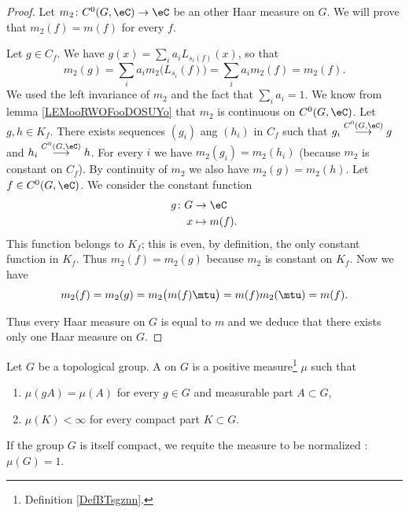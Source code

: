 \begin{proof}
    Let \( m_2\colon C^0(G,\eC)\to \eC\) be an other Haar measure on \( G\). We will prove that \( m_2(f)=m(f)\) for every \( f\). 
    \begin{subproof}
    \spitem[\( m_2\) is constant on \( C_f\)]
        Let \( g\in C_f\). We have \( g(x)=\sum_ia_iL_{s_i(f)}(x)\), so that
        \begin{equation}
            m_2(g)=\sum_ia_im_2\big(L_{s_i}(f)\big)=\sum_ia_im_2(f)=m_2(f).
        \end{equation}
        We used the left invariance of \( m_2\) and the fact that \( \sum_ia_i=1\).
    \spitem[\( m_2\) is constant on \( K_f\)]
        We know from lemma \ref{LEMooRWOFooDOSUYo} that \( m_2\) is continuous on \( C^0(G,\eC)\). Let \( g,h\in K_f\). There exists sequences \( (g_i)\) ang \( (h_i)\) in \( C_f\) such that \( g_i\stackrel{C^0(G,\eC)}{\longrightarrow}g\) and \( h_i\stackrel{C^0(G,\eC)}{\longrightarrow} h\). For every \( i\) we have \( m_2(g_i)=m_2(h_i)\) (because \( m_2\) is constant on \( C_f\)). By continuity of \( m_2\) we also have \( m_2(g)=m_2(h)\).
    \spitem[\( m_2=m\)]
        Let \( f\in C^0(G,\eC)\). We consider the constant function 
        \begin{equation}
            \begin{aligned}
                g\colon G&\to \eC \\
                x&\mapsto m(f). 
            \end{aligned}
        \end{equation}
        This function belongs to \( K_f\); this is even, by definition, the only constant function in \( K_f\). Thus \( m_2(f)=m_2(g)\) because \( m_2\) is constant on \( K_f\). Now we have
        \begin{equation}
            m_2(f)=m_2(g)=m_2\big( m(f)\mtu \big)=m(f)m_2(\mtu)=m(f).
        \end{equation}
    \end{subproof}
    Thus every Haar measure on \( G\) is equal to \( m\) and we deduce that there exists only one Haar measure on \( G\).
\end{proof}

\begin{definition}      \label{DEFooXIKEooWOxHlr}
    Let \( G\) be a topological group. A  on \( G\) is a positive measure\footnote{Definition \ref{DefBTsgznn}.} \( \mu\) such that
	\begin{enumerate}
		\item
		      \( \mu(gA)=\mu(A)\) for every \( g\in G\) and measurable part \( A\subset G\),
		\item
		      \( \mu(K)<\infty\) for every compact part \( K\subset G\).
	\end{enumerate}
    If the group \( G\) is itself compact, we requite the measure to be normalized : \( \mu(G)=1\).
\end{definition}


